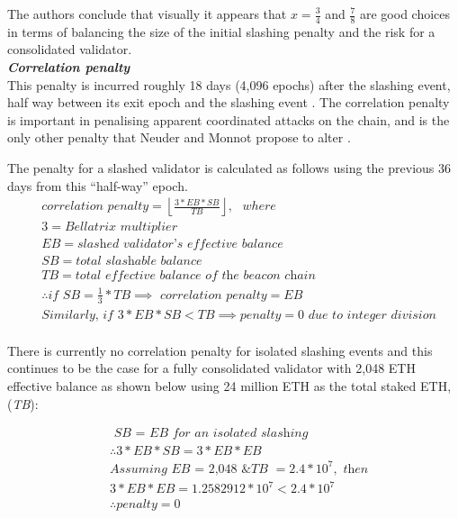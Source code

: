 The authors conclude that visually it appears that $x = \frac{3}{4}$ and $\frac{7}{8}$ are good choices in terms of balancing the size of the initial slashing penalty and the risk for a consolidated validator.\\

\noindent
\textbf{\textit{Correlation penalty}} \\
This penalty is incurred roughly 18 days (4,096 epochs) after the slashing event, half way between its exit epoch and the slashing event \cite{Edgington2023}. The correlation penalty is important in penalising apparent coordinated attacks on the chain, and is the only other penalty that Neuder and Monnot propose to alter \cite{Neuder2023d}.

The penalty for a slashed validator is calculated as follows using the previous 36 days from this ``half-way'' epoch.
\begin{equation*}
\begin{split}
& \textit{correlation penalty} = \left\lfloor \frac{3*EB*SB}{TB} \right\rfloor, \texttt{ } where \\
& 3 = \textit{Bellatrix multiplier} \\
& EB = \textit{slashed validator's effective balance} \\
& SB = \textit{total slashable balance} \\
& TB = \textit{total effective balance of the beacon chain} \\
& \therefore \textit{if SB} = \frac{1}{3} * TB \implies \textit{ correlation penalty} = EB \\
& \textit{Similarly, if } 3*EB*SB <  TB \implies penalty = 0 \textit{ due to integer division} \\
\end{split}
\end{equation*}

There is currently no correlation penalty for isolated slashing events and this continues to be the case for a fully consolidated validator with 2,048 ETH effective balance as shown below using 24 million ETH as the total staked ETH, (\textit{TB}):

\begin{equation*}
\begin{split}
& \textit{ SB = EB for an isolated slashing} \\
& \therefore  3*EB*SB =  3*EB*EB \\
& \textit{Assuming EB = 2,048 \& TB } = 2.4 * 10^7, \textit{ then} \\
& 3*EB*EB = 1.2582912 * 10^7 < 2.4 * 10^7 \\
& \therefore penalty = 0
\end{split}
\end{equation*}

